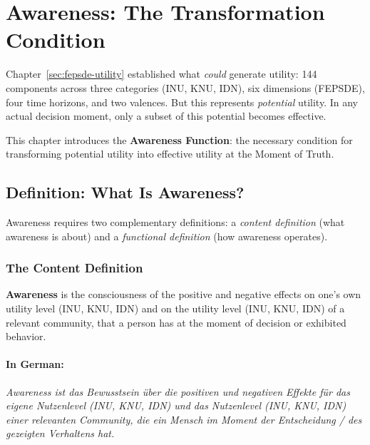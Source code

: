 \section{Awareness: The Transformation Condition}
\label{sec:awareness}


Chapter~\ref{sec:fepsde-utility} established what \emph{could} generate utility:
144 components across three categories (INU, KNU, IDN), six dimensions (FEPSDE),
four time horizons, and two valences. But this represents \emph{potential} utility.
In any actual decision moment, only a subset of this potential becomes effective.

This chapter introduces the \textbf{Awareness Function}: the necessary condition
for transforming potential utility into effective utility at the Moment of Truth.

\subsection{Definition: What Is Awareness?}
\label{subsec:awareness-definition}

Awareness requires two complementary definitions: a \emph{content definition}
(what awareness is about) and a \emph{functional definition} (how awareness operates).

\subsubsection{The Content Definition}

\begin{definition}
\label{def:awareness-content}
\textbf{Awareness} is the consciousness of the positive and negative effects 
on one's own utility level (INU, KNU, IDN) and on the utility level (INU, KNU, IDN) 
of a relevant community, that a person has at the moment of decision or 
exhibited behavior.
\end{definition}

\paragraph{In German:}
\textit{Awareness ist das Bewusstsein über die positiven und negativen Effekte 
für das eigene Nutzenlevel (INU, KNU, IDN) und das Nutzenlevel (INU, KNU, IDN) 
einer relevanten Community, die ein Mensch im Moment der Entscheidung / 
des gezeigten Verhaltens hat.}

